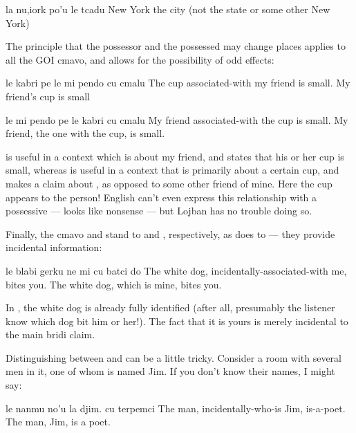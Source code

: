 \begin{example}
la nu,iork po'u le tcadu\n
New York the city (not the state or some other New York)
\end{example}

The principle that the possessor and the possessed may change
    places applies to all the GOI cmavo, and allows for the
    possibility of odd effects:
\begin{example}
le kabri pe le mi pendo cu cmalu\n
The cup associated-with my friend is small.\n
My friend's cup is small
\end{example}

\begin{example}
le mi pendo pe le kabri cu cmalu\n
My friend associated-with the cup is small.\n
My friend, the one with the cup, is small.
\end{example}

 is useful in a context which
    is about my friend, and states that his or her cup is small,
    whereas  is useful in a
    context that is primarily about a certain cup, and makes a
    claim about , as opposed to some other
    friend of mine. Here the cup appears to  the person!
    English can't even express this relationship with a possessive
    ---  looks like nonsense --- but
    Lojban has no trouble doing so. 

Finally, the cmavo  and  stand to  and
    , respectively, as  does to  --- they
    provide incidental information:
\begin{example}
le blabi gerku ne mi cu batci do\n
The white dog, incidentally-associated-with me,\n
\T	bites you.\n
The white dog, which is mine, bites you.
\end{example}

In , the white dog is
    already fully identified (after all, presumably the listener
    know which dog bit him or her!). The fact that it is yours is
    merely incidental to the main bridi claim.

Distinguishing between  and  can be a little
    tricky. Consider a room with several men in it, one of whom is
    named Jim. If you don't know their names, I might say:
\begin{example}
le nanmu no'u la djim. cu terpemci\n
The man, incidentally-who-is Jim, is-a-poet.\n
The man, Jim, is a poet.
\end{example}

